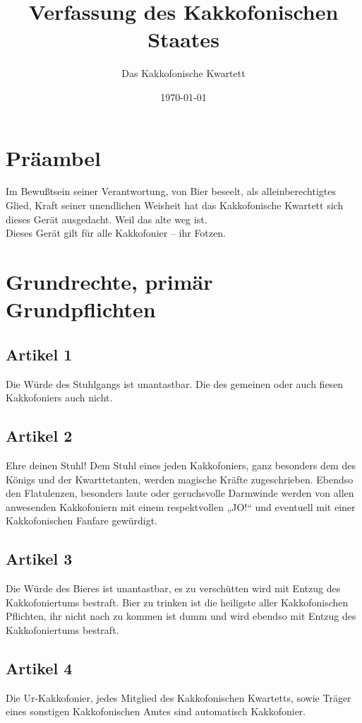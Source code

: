 \documentclass[ngerman, fontsize=12pt, parskip=half, footsepline]{scrartcl}
\title{Verfassung des Kakkofonischen Staates}
\author{Das Kakkofonische Kwartett}
\date{\today}
\begin{document}
\maketitle{}
\section*{Präambel}

Im Bewußtsein seiner Verantwortung, von Bier beseelt, als alleinberechtigtes Glied, Kraft seiner
unendlichen Weisheit hat das Kakkofonische Kwartett sich dieses Gerät ausgedacht. Weil das alte weg ist.\\
Dieses Gerät gilt für alle Kakkofonier – ihr Fotzen.

\section{Grundrechte, primär Grundpflichten}

\subsection*{Artikel 1}
Die Würde des Stuhlgangs ist unantastbar. Die des gemeinen oder auch fiesen Kakkofoniers auch nicht.

\subsection*{Artikel 2}
Ehre deinen Stuhl! Dem Stuhl eines jeden Kakkofoniers, ganz besonders dem des Königs und der Kwarttetanten, werden magische Kräfte zugeschrieben. Ebendso den Flatulenzen, besonders laute oder geruchsvolle Darmwinde werden von allen anwesenden Kakkofoniern mit einem respektvollen „JO!“ und eventuell mit einer Kakkofonischen Fanfare gewürdigt.

\subsection*{Artikel 3}
Die Würde des Bieres ist unantastbar, es zu verschütten wird mit  Entzug des Kakkofoniertums bestraft. Bier zu trinken ist die heiligste aller Kakkofonischen Pflichten, ihr nicht nach zu kommen ist dumm und wird ebendso mit Entzug des Kakkofoniertums bestraft.

\subsection*{Artikel 4}
Die Ur-Kakkofonier, jedes Mitglied des Kakkofonischen Kwartetts, sowie Träger eines sonstigen Kakkofonischen Amtes sind automatisch Kakkofonier.
\end{document}
